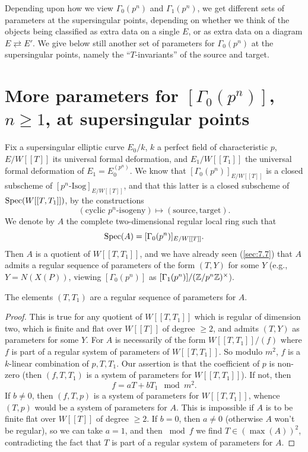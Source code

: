 \begin{krem}\label{rem:7.7.1}
Depending upon how we view $\Gamma_0(p^n)$ and $\Gamma_1(p^n)$, we get different sets of parameters at the supersingular points, depending on whether we think of the objects being classified as extra data on a single $E$, or as extra data on a diagram $E \rightleftarrows E'$. We give below still another set of parameters for $\Gamma_0(p^n)$ at the supersingular points, namely the ``$T$-invariants'' of the source and target.
\end{krem}

\section{More parameters for $[\Gamma_0(p^n)]$, $n \geq 1$, at supersingular points}
\label{sec:7.8}

\kmitem\label{item:7.8.1}
Fix a supersingular elliptic curve $E_0/k$, $k$ a perfect field of characteristic $p$, $E/W[[T]]$ its universal formal deformation, and $E_1/W[[T_1]]$ the universal formal deformation of $E_1 = E_0^{(p^n)}$. We know that $[\Gamma_0(p^n)]_{E/W[[T]]}$ is a closed subscheme of $[p^n\text{-Isog}]_{E/W[[T]]}$, and that this latter is a closed subscheme of $\operatorname{Spec}(W[[T,T_1]])$, by the constructions
\[
(\text{cyclic } p^n\text{-isogeny}) \mapsto (\text{source}, \text{target}) .
\]
We denote by $A$ the complete two-dimensional regular local ring such that
\[
\operatorname{Spec}(A) = [\Gamma_0(p^n)]_{E/W[[T]]} .
\]
Then $A$ is a quotient of $W[[T,T_1]]$, and we have already seen (\ref{sec:7.7}) that $A$ admits a regular sequence of parameters of the form $(T,Y)$ for some $Y$ (e.g., $Y = N(X(P))$, viewing $[\Gamma_0(p^n)]$ as $[\Gamma_1(p^n)]/(\mathbb{Z}/p^n\mathbb{Z})^\times$).

\begin{kprop}\label{prop:7.8.2}
The elements $(T,T_1)$ are a regular sequence of parameters for $A$.
\end{kprop}

\begin{proof}
This is true for any quotient of $W[[T,T_1]]$ which is regular of dimension two, which is finite and flat over $W[[T]]$ of degree $\geq 2$, and admits $(T,Y)$ as parameters for some $Y$. For $A$ is necessarily of the form $W[[T,T_1]]/(f)$ where $f$ is part of a regular system of parameters of $W[[T,T_1]]$. So modulo $m^2$, $f$ is a $k$-linear combination of $p,T,T_1$. Our assertion is that the coefficient of $p$ is non-zero (then $(f,T,T_1)$ is a system of parameters for $W[[T,T_1]]$). If not, then
\[
f = aT + bT_1 \mod m^2 .
\]
If $b \neq 0$, then $(f,T,p)$ is a system of parameters for $W[[T,T_1]]$, whence $(T,p)$ would be a system of parameters for $A$. This is impossible if $A$ is to be finite flat over $W[[T]]$ of degree $\geq 2$. If $b = 0$, then $a \neq 0$ (otherwise $A$ won't be regular), so we can take $a = 1$, and then $\bmod f$ we find $T \in (\max(A))^2$, contradicting the fact that $T$ is part of a regular system of parameters for $A$.
\end{proof}

